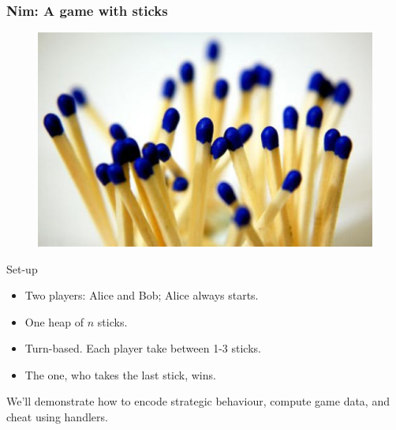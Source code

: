 \begin{frame}
  \frametitle{Nim: A game with sticks}
  \begin{center}
    \begin{figure}
      \includegraphics[scale=0.3]{sticks.jpg}
    \end{figure}
  \end{center}
  Set-up
  \begin{itemize}
    \item Two players: Alice and Bob; Alice always starts.
    \item One heap of $n$ sticks.
    \item Turn-based. Each player take between 1-3 sticks.
    \item The one, who takes the last stick, wins.
  \end{itemize}
We'll demonstrate how to encode strategic behaviour, compute game data, and cheat using handlers.
\end{frame}


